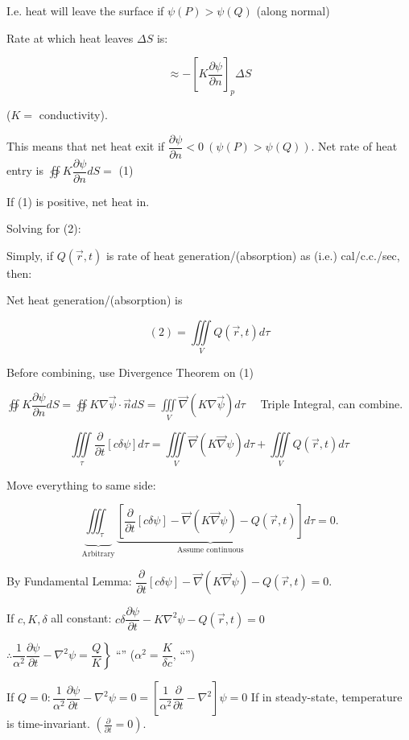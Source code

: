 \documentclass{report}
\begin{document}
I.e. heat will leave the surface if $\psi(P)>\psi(Q)$ (along normal)

Rate at which heat leaves $\Delta S$ is: 

$$
\approx-\left[K \dfrac{\partial \psi}{\partial n}\right]_{p} \Delta S
$$

($K=$ conductivity).

This means that net heat exit if $\dfrac{\partial \psi}{\partial n}<0\ (\psi(P)>\psi(Q))$. Net rate of heat entry is $\oiint K \dfrac{\partial \psi}{\partial n} d S=$ (1)

If (1) is positive, net heat in.

Solving for (2):

Simply, if $Q(\vec{r}, t)$ is rate of heat generation/(absorption) as (i.e.) cal/c.c./sec, then:

Net heat generation/(absorption) is

$$
(2)=\iiint\limits_{V} Q(\vec{r}, t) d \tau
$$

Before combining, use Divergence Theorem on (1)

$\oiint K \dfrac{\partial \psi}{\partial n} d S=\oiint  K \nabla \vec{\psi} \cdot \vec{n} d S=\iiint\limits_{V} \vec{\nabla}(K \nabla \vec{\psi}) d \tau \quad$ Triple Integral, can combine.


\begin{equation*}
\iiint\limits_{\tau} \dfrac{\partial}{\partial t}[c \delta \psi] d \tau=\iiint\limits_{V} \vec{\nabla}(K \vec{\nabla} \psi) d \tau+\iiint\limits_{V} Q(\vec{r}, t) d \tau
\end{equation*}


Move everything to same side:

$$
\underbrace{\iiint_{\tau}}_{\text {Arbitrary}} \underbrace{\left[\dfrac{\partial}{\partial t}[c \delta \psi]-\vec{\nabla}(K \vec{\nabla} \psi)-Q(\vec{r}, t)\right]}_{\text{Assume continuous}} d \tau=0.
$$

By Fundamental Lemma: $\dfrac{\partial}{\partial t}[c \delta \psi]-\vec{\nabla}(K \vec{\nabla} \psi)-Q(\vec{r}, t)=0$.

If $c, K, \delta$ all constant: $c \delta \dfrac{\partial \psi}{\partial t}-K \nabla^{2} \psi-Q(\vec{r}, t)=0$

$\left.\therefore \dfrac{1}{\alpha^{2}} \dfrac{\partial \psi}{\partial t}-\nabla^{2} \psi=\dfrac{Q}{K}\right\}$ ``'' ($\alpha^{2}=\dfrac{K}{\delta c}$, ``'')

If $Q=0: \dfrac{1}{\alpha^{2}} \dfrac{\partial \psi}{\partial t}-\nabla^{2} \psi=0=\left[\dfrac{1}{\alpha^{2}} \dfrac{\partial}{\partial t}-\nabla^{2}\right] \psi=0$ If in steady-state, temperature is time-invariant. $\left(\frac{\partial}{\partial t}=0\right)$.
\end{document}
